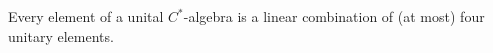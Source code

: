 Every element of a unital $C^*$-algebra is a linear combination of (at most) four unitary elements.
